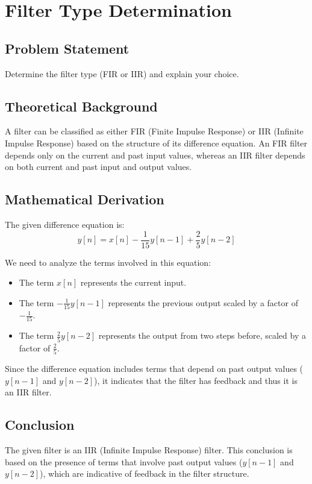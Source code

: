 \item[(b)]
\section{Filter Type Determination}

\subsection*{Problem Statement}
Determine the filter type (FIR or IIR) and explain your choice.

\subsection*{Theoretical Background}
A filter can be classified as either FIR (Finite Impulse Response) or IIR (Infinite Impulse Response) based on the structure of its difference equation. An FIR filter depends only on the current and past input values, whereas an IIR filter depends on both current and past input and output values.

\subsection*{Mathematical Derivation}
The given difference equation is:
\[ y[n] = x[n] - \frac{1}{15} y[n-1] + \frac{2}{5} y[n-2] \]

We need to analyze the terms involved in this equation:
\begin{itemize}
    \item The term \( x[n] \) represents the current input.
    \item The term \( -\frac{1}{15} y[n-1] \) represents the previous output scaled by a factor of \(-\frac{1}{15}\).
    \item The term \( \frac{2}{5} y[n-2] \) represents the output from two steps before, scaled by a factor of \(\frac{2}{5}\).
\end{itemize}

Since the difference equation includes terms that depend on past output values (\( y[n-1] \) and \( y[n-2] \)), it indicates that the filter has feedback and thus it is an IIR filter.

\subsection*{Conclusion}
The given filter is an IIR (Infinite Impulse Response) filter. This conclusion is based on the presence of terms that involve past output values (\( y[n-1] \) and \( y[n-2] \)), which are indicative of feedback in the filter structure.
